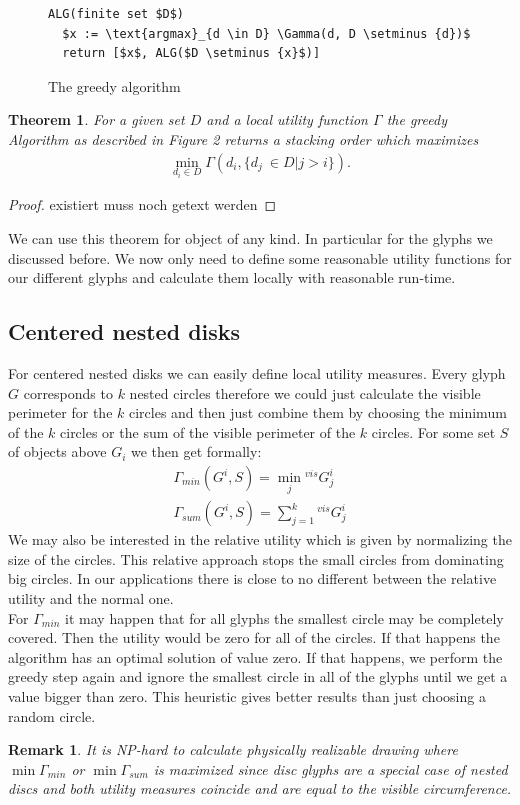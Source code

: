 \documentclass[a4paper,11pt]{article}
\newtheorem{theorem}{Theorem}
\newtheorem*{remark}{Remark}
\begin{document}
\begin{figure}[!t]
\begin{lstlisting}[mathescape=true ]
ALG(finite set $D$)
  $x := \text{argmax}_{d \in D} \Gamma(d, D \setminus {d})$
  return [$x$, ALG($D \setminus {x}$)]
\end{lstlisting}
\caption{The greedy algorithm}
\end{figure}

\begin{theorem}
For a given set $D$ and a local utility function $\Gamma$ the greedy Algorithm as described in Figure 2 returns a stacking order which maximizes\begin{align*}
\min_{d_i \in D} \Gamma(d_i, \{d_j\ \in D | j > i\}).
\end{align*}
\end{theorem}
\begin{proof}
\color{blue}
existiert muss noch getext werden
\color{black}
\end{proof}
We can use this theorem for object of any kind. In particular for the glyphs we discussed before. We now only need to define some reasonable utility functions for our different glyphs and calculate them locally with reasonable run-time.

\subsection{Centered nested disks}
For centered nested disks we can easily define local utility measures. Every glyph $G$ corresponds to $k$ nested circles therefore we could just calculate the visible perimeter for the $k$ circles and then just combine them by choosing the minimum of the $k$ circles or the sum of the visible perimeter of the $k$ circles. For some set $S$ of objects above $G_i$ we then get formally:
\begin{align*}
\Gamma_{min}({G^i,S})=\min_j  {^{vis} G^i_j}\\
\Gamma_{sum}({G^i,S})=\sum_{j=1}^k  {^{vis} G^i_j}
\end{align*}
We may also be interested in the relative utility which is given by normalizing the size of the circles. This relative approach stops the small circles from dominating big circles. In our applications there is close to no different between the relative utility and the normal one. \\

For $\Gamma_{min}$ it may happen that for all glyphs the smallest circle may be completely covered. Then the utility would be zero for all of the circles. If that happens the algorithm has an optimal solution of value zero. If that happens, we perform the greedy step again and ignore the smallest circle in all of the glyphs until we get a value bigger than zero. This heuristic gives better results than just choosing a random circle.\\
%
\begin{remark}
It is NP-hard to calculate physically realizable drawing where $\min\Gamma_{min}$ or $\min\Gamma_{sum}$ is maximized since disc glyphs are a special case of nested discs and both utility measures coincide and are equal to the visible circumference.
\end{remark}
%
\end{document}
